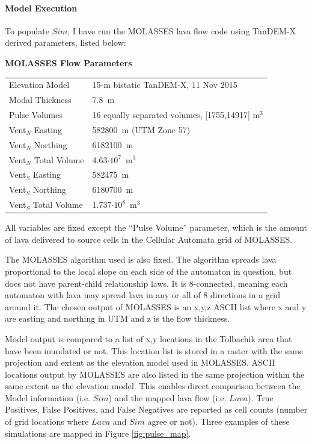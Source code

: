 \documentclass[12pt,letter]{article}
\begin{document}
		\paragraph{Model Execution} To populate $Sim$, I have run the MOLASSES lava flow code using TanDEM-X derived parameters, listed below:
		\begin{center}
			\textbf{MOLASSES Flow Parameters}\\
			\begin{tabular}{l l}
				\toprule
				Elevation Model & 15-m bistatic TanDEM-X, 11 Nov 2015\\
				Modal Thickness & 7.8~m\\
				Pulse Volumes & 16 equally separated volumes, [1755,14917] m$^3$\\
				\midrule
				Vent$_N$ Easting & 582800~m (UTM Zone 57)\\
				Vent$_N$ Northing & 6182100~m\\
				Vent$_N$ Total Volume & 4.63$\cdot10^7$~m$^3$\\
				\midrule
				Vent$_S$ Easting & 582475~m\\
				Vent$_S$ Northing & 6180700~m\\
				Vent$_S$ Total Volume & 1.737$\cdot10^8$~m$^3$\\
				\bottomrule
			\end{tabular}
		\end{center}
		All variables are fixed except the ``Pulse Volume'' parameter, which is the amount of lava delivered to source cells in the Cellular Automata grid of MOLASSES.

		The MOLASSES algorithm used is also fixed. The algorithm spreads lava proportional to the local slope on each side of the automaton in question, but does not have parent-child relationship laws. It is 8-connected, meaning each automaton with lava may spread lava in any or all of 8 directions in a grid around it. The chosen output of MOLASSES is an x,y,z ASCII list where x and y are easting and northing in UTM and z is the flow thickness.

		Model output is compared to a list of x,y locations in the Tolbachik area that have been inundated or not. This location list is stored in a raster with the same projection and extent as the elevation model used in MOLASSES. ASCII locations output by MOLASSES are also listed in the same projection within the same extent as the elevation model. This enables direct comparison between the Model information (i.e. $Sim$) and the mapped lava flow (i.e. $Lava$). True Positives, False Positives, and False Negatives are reported as cell counts (number of grid locations where $Lava$ and $Sim$ agree or not). Three examples of these simulations are mapped in Figure \ref{fig:pulse_map}.
\end{document}

